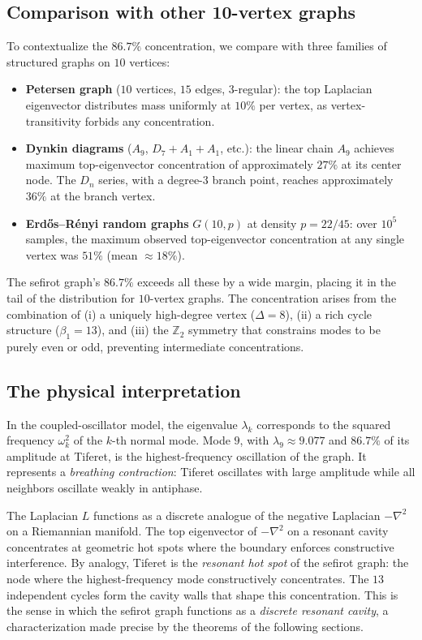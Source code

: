 \documentclass[11pt,a4paper]{amsart}
\theoremstyle{remark}
\newcommand{\bbZ}{\mathbb{Z}}
\begin{document}
\subsection{Comparison with other 10-vertex graphs}
\label{sec:comparison}

To contextualize the $86.7\%$ concentration, we compare with three families
of structured graphs on $10$ vertices:
\begin{itemize}[leftmargin=*]
\item \textbf{Petersen graph} ($10$ vertices, $15$ edges, 3-regular): the
  top Laplacian eigenvector distributes mass uniformly at $10\%$ per
  vertex, as vertex-transitivity forbids any concentration.
\item \textbf{Dynkin diagrams} ($A_9$, $D_7 + A_1 + A_1$, etc.): the linear
  chain $A_9$ achieves maximum top-eigenvector concentration of
  approximately $27\%$ at its center node. The $D_n$ series, with a
  degree-$3$ branch point, reaches approximately $36\%$ at the branch
  vertex.
\item \textbf{Erd\H{o}s--R\'enyi random graphs} $G(10, p)$ at density
  $p = 22/45$: over $10^5$ samples, the maximum observed top-eigenvector
  concentration at any single vertex was $51\%$ (mean $\approx 18\%$).
\end{itemize}

The sefirot graph's $86.7\%$ exceeds all these by a wide margin, placing it
in the tail of the distribution for $10$-vertex graphs. The concentration
arises from the combination of (i) a uniquely high-degree vertex
($\Delta = 8$), (ii) a rich cycle structure ($\beta_1 = 13$), and (iii) the
$\bbZ_2$ symmetry that constrains modes to be purely even or odd, preventing
intermediate concentrations.

\subsection{The physical interpretation}
\label{sec:physical-interp}

In the coupled-oscillator model, the eigenvalue $\lambda_k$ corresponds to
the squared frequency $\omega_k^2$ of the $k$-th normal mode. Mode $9$,
with $\lambda_9 \approx 9.077$ and $86.7\%$ of its amplitude at Tiferet,
is the highest-frequency oscillation of the graph. It represents a
\emph{breathing contraction}: Tiferet oscillates with large amplitude
while all neighbors oscillate weakly in antiphase.

The Laplacian $L$ functions as a discrete analogue of the negative
Laplacian $-\nabla^2$ on a Riemannian manifold. The top eigenvector of
$-\nabla^2$ on a resonant cavity concentrates at geometric hot spots where
the boundary enforces constructive interference. By analogy, Tiferet is the
\emph{resonant hot spot} of the sefirot graph: the node where the
highest-frequency mode constructively concentrates. The $13$ independent
cycles form the cavity walls that shape this concentration. This is the
sense in which the sefirot graph functions as a \emph{discrete resonant
cavity}, a characterization made precise by the theorems of the following
sections.
\end{document}

